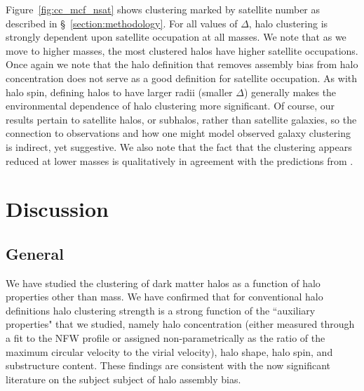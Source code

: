 \documentclass[usenatbib,fleqn]{mnras}
\begin{document}
Figure~\ref{fig:cc_mcf_nsat} shows clustering marked by satellite number as described in 
\S~\ref{section:methodology}. For all values of $\Delta$, halo clustering is strongly dependent 
upon satellite occupation at all masses. We note that as we move to higher masses, the most clustered halos have higher satellite occupations. Once again we note that the halo definition that removes assembly bias from halo concentration does not serve as a good definition for satellite occupation. As with halo spin, defining halos to have larger radii (smaller 
$\Delta$) generally makes the environmental dependence of halo clustering more 
significant. Of course, our results pertain to satellite halos, or subhalos, rather than 
satellite galaxies, so the connection to observations and how one might 
model observed galaxy clustering is indirect, yet suggestive. We also note that the fact that the clustering
appears reduced at lower masses is qualitatively in agreement with the predictions from \citet{wechsler_etal06}. 


\section{Discussion}
\label{section:discussion}

\subsection{General}

We have studied the clustering of dark matter halos as a function of halo properties other than mass. We have confirmed that for conventional halo definitions halo clustering strength is a strong function of the  ``auxiliary properties" that we studied, namely halo concentration (either measured through a fit to the NFW profile or assigned non-parametrically as the ratio of the maximum circular velocity to
the virial velocity), halo shape, halo spin, and substructure content. These findings are consistent with the now significant literature on the subject subject of halo assembly bias. \citep{peacock_smith00, wechsler_etal02,sheth_tormen04, gao_etal05, zentner_etal05, allgood_etal06, harker_etal06, wechsler_etal06, croton_etal07, zentner07, dalal_etal08, zentner_etal14, mao_etal15, sunayama_etal16}
\end{document}
